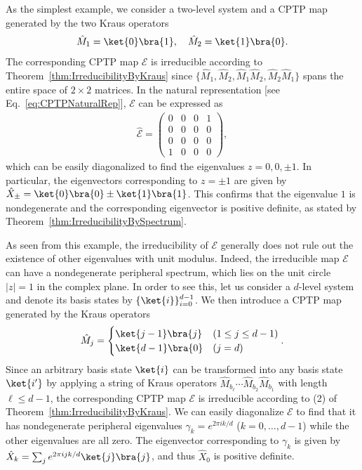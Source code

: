 \documentclass[preprint,pteplogo]{ptephy_v2}%
\numberwithin{equation}{section}
\theoremstyle{definition}
\newcommand{\mc}[1]{\mathcal{#1}}
\begin{document}
As the simplest example, we consider a two-level system and a CPTP map generated by the two Kraus operators 
\begin{align} \label{eq:IrreducibleCPTPEx1}
\hat{M}_1 = \ket{0} \bra{1}, \quad
\hat{M}_2 = \ket{1} \bra{0}.
\end{align}
The corresponding CPTP map $\mc{E}$ is irreducible according to Theorem~\ref{thm:IrreducibilityByKraus} since $\{ \hat{M}_1, \hat{M}_2, \hat{M}_1 \hat{M}_2, \hat{M}_2 \hat{M}_1 \}$ spans the entire space of $2 \times 2$ matrices.
In the natural representation [see Eq.~\eqref{eq:CPTPNaturalRep}], $\mc{E}$ can be expressed as
\begin{align}
\hat{\mc{E}} = \begin{pmatrix} 0 & 0 & 0 & 1 \\ 0 & 0 & 0 & 0 \\ 0 & 0 & 0 & 0 \\ 1 
& 0 & 0 & 0\end{pmatrix},
\end{align}
which can be easily diagonalized to find the eigenvalues $z= 0, 0, \pm 1$. 
In particular, the eigenvectors corresponding to $z=\pm1$ are given by $\hat{X}_\pm = \ket{0} \bra{0} \pm \ket{1} \bra{1}$.
This confirms that the eigenvalue $1$ is nondegenerate and the corresponding eigenvector is positive definite, as stated by Theorem~\ref{thm:IrreducibilityBySpectrum}.

As seen from this example, the irreducibility of $\mc{E}$ generally does not rule out the existence of other eigenvalues with unit modulus. 
Indeed, the irreducible map $\mc{E}$ can have a nondegenerate peripheral spectrum, which lies on the unit circle $|z|=1$ in the complex plane. 
In order to see this, let us consider a $d$-level system and denote its basis states by $\{\ket{i} \}_{i=0}^{d-1}$. 
We then introduce a CPTP map generated by the Kraus operators
\begin{align} \label{eq:KrausIrreducibleEx}
\hat{M}_j = \begin{cases} \ket{j-1}\bra{j} & (1 \leq j \leq d-1) \\ \ket{d-1}\bra{0} & (j=d) \end{cases}.
\end{align}
Since an arbitrary basis state $\ket{i}$ can be transformed into any basis state $\ket{i'}$ by applying a string of Kraus operators $\hat{M}_{b_\ell} \cdots \hat{M}_{b_2} \hat{M}_{b_1}$ with length $\ell \leq d-1$, the corresponding CPTP map $\mc{E}$ is irreducible according to (2) of Theorem~\ref{thm:IrreducibilityByKraus}. 
We can easily diagonalize $\mc{E}$ to find that it has nondegenerate peripheral eigenvalues $\gamma_k = e^{2\pi i k/d}$ ($k=0,\ldots,d-1$) while the other eigenvalues are all zero. 
The eigenvector corresponding to $\gamma_k$ is given by $\hat{X}_k = \sum_j e^{2\pi i jk/d} \ket{j} \bra{j}$, and thus $\hat{X}_0$ is positive definite.
\end{document}
